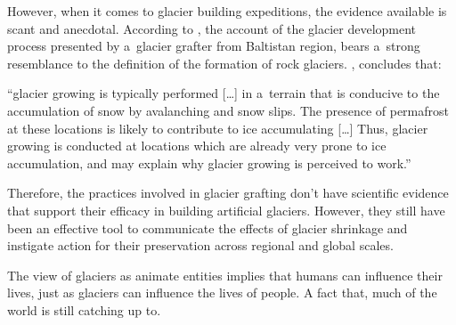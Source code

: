 However, when it comes to glacier building expeditions, the evidence available is scant and anecdotal. According
to \citet{tveitenGlacierGrowingLocal2007}, the account of the glacier development process presented by a glacier
grafter from Baltistan region, bears a strong resemblance to the definition of the formation of rock glaciers.
\citet{tveitenGlacierGrowingLocal2007}, concludes that: 

\begin{thesis_quotation}

“glacier growing is typically performed […] in a terrain that is conducive to the accumulation of snow by
avalanching and snow slips. The presence of permafrost at these locations is likely to contribute to ice
accumulating […] Thus, glacier growing is conducted at locations which are already very prone to ice
accumulation, and may explain why glacier growing is perceived to work.” 

\end{thesis_quotation}

Therefore, the practices involved in glacier grafting don't have scientific evidence that support their efficacy
in building artificial glaciers. However, they still have been an effective tool to communicate the effects of
glacier shrinkage and instigate action for their preservation across regional and global scales. 


The view of glaciers as animate entities implies that humans can influence their lives, just as glaciers can
influence the lives of people. A fact that, much of the world is still catching up to.


